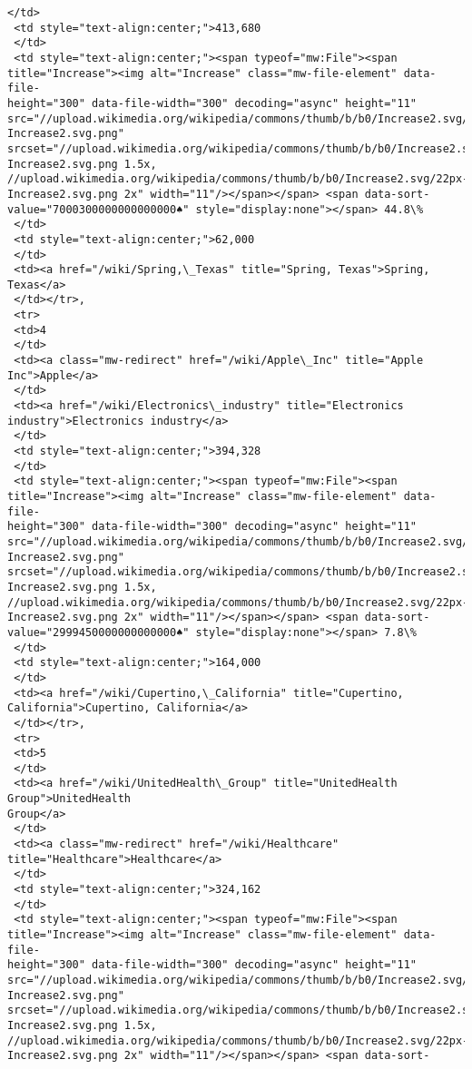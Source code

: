 \documentclass[11pt]{article}
\begin{document}
\begin{tcolorbox}[breakable, size=fbox, boxrule=.5pt, pad at break*=1mm, opacityfill=0]
\begin{Verbatim}[commandchars=\\\{\}]
 </td>
 <td style="text-align:center;">413,680
 </td>
 <td style="text-align:center;"><span typeof="mw:File"><span
title="Increase"><img alt="Increase" class="mw-file-element" data-file-
height="300" data-file-width="300" decoding="async" height="11"
src="//upload.wikimedia.org/wikipedia/commons/thumb/b/b0/Increase2.svg/11px-
Increase2.svg.png"
srcset="//upload.wikimedia.org/wikipedia/commons/thumb/b/b0/Increase2.svg/17px-
Increase2.svg.png 1.5x,
//upload.wikimedia.org/wikipedia/commons/thumb/b/b0/Increase2.svg/22px-
Increase2.svg.png 2x" width="11"/></span></span> <span data-sort-
value="7000300000000000000♠" style="display:none"></span> 44.8\%
 </td>
 <td style="text-align:center;">62,000
 </td>
 <td><a href="/wiki/Spring,\_Texas" title="Spring, Texas">Spring, Texas</a>
 </td></tr>,
 <tr>
 <td>4
 </td>
 <td><a class="mw-redirect" href="/wiki/Apple\_Inc" title="Apple Inc">Apple</a>
 </td>
 <td><a href="/wiki/Electronics\_industry" title="Electronics
industry">Electronics industry</a>
 </td>
 <td style="text-align:center;">394,328
 </td>
 <td style="text-align:center;"><span typeof="mw:File"><span
title="Increase"><img alt="Increase" class="mw-file-element" data-file-
height="300" data-file-width="300" decoding="async" height="11"
src="//upload.wikimedia.org/wikipedia/commons/thumb/b/b0/Increase2.svg/11px-
Increase2.svg.png"
srcset="//upload.wikimedia.org/wikipedia/commons/thumb/b/b0/Increase2.svg/17px-
Increase2.svg.png 1.5x,
//upload.wikimedia.org/wikipedia/commons/thumb/b/b0/Increase2.svg/22px-
Increase2.svg.png 2x" width="11"/></span></span> <span data-sort-
value="2999450000000000000♠" style="display:none"></span> 7.8\%
 </td>
 <td style="text-align:center;">164,000
 </td>
 <td><a href="/wiki/Cupertino,\_California" title="Cupertino,
California">Cupertino, California</a>
 </td></tr>,
 <tr>
 <td>5
 </td>
 <td><a href="/wiki/UnitedHealth\_Group" title="UnitedHealth Group">UnitedHealth
Group</a>
 </td>
 <td><a class="mw-redirect" href="/wiki/Healthcare"
title="Healthcare">Healthcare</a>
 </td>
 <td style="text-align:center;">324,162
 </td>
 <td style="text-align:center;"><span typeof="mw:File"><span
title="Increase"><img alt="Increase" class="mw-file-element" data-file-
height="300" data-file-width="300" decoding="async" height="11"
src="//upload.wikimedia.org/wikipedia/commons/thumb/b/b0/Increase2.svg/11px-
Increase2.svg.png"
srcset="//upload.wikimedia.org/wikipedia/commons/thumb/b/b0/Increase2.svg/17px-
Increase2.svg.png 1.5x,
//upload.wikimedia.org/wikipedia/commons/thumb/b/b0/Increase2.svg/22px-
Increase2.svg.png 2x" width="11"/></span></span> <span data-sort-

\end{Verbatim}
\end{tcolorbox}
\end{document}

